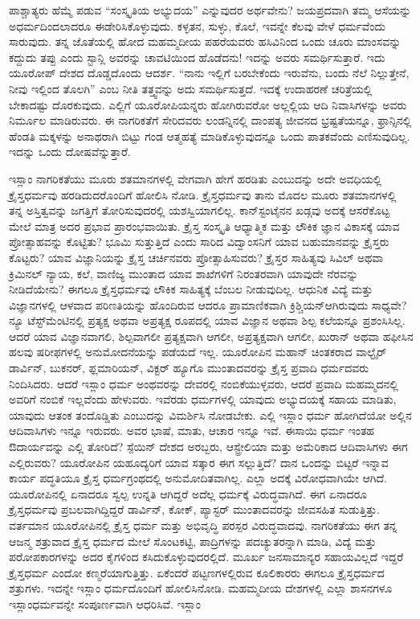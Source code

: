 ಪಾಶ್ಚಾತ್ಯರು ಹೆಮ್ಮೆ ಪಡುವ “ಸಂಸ್ಕೃತಿಯ ಅಭ್ಯುದಯ” ಎನ್ನುವುದರ ಅರ್ಥವೇನು? ಜಯಪ್ರದವಾಗಿ ತಮ್ಮ ಆಸೆಯನ್ನು ಅಧರ್ಮದಿಂದಲಾದರೂ ಈಡೇರಿಸಿಕೊಳ್ಳುವುದು. ಕಳ್ಳತನ, ಸುಳ್ಳು, ಕೊಲೆ, ಇವನ್ನೇ ಕೆಲವು ವೇಳೆ ಧರ್ಮವೆಂದು ಸಾರುವುದು. ತನ್ನ ಜೊತೆಯಲ್ಲಿ ಹೋದ ಮಹಮ್ಮದೀಯ ಪಹರೆಯವರು ಹಸಿವಿನಿಂದ ಒಂದು ಚೂರು ಮಾಂಸವನ್ನು ಕದ್ದುದು ತಪ್ಪು ಎಂದು ಸ್ಟಾನ್ಲಿ ಅವರನ್ನು ಚಾವಟಿಯಿಂದ ಹೊಡೆದನು! ಇದನ್ನು ಅವರು ಸಮರ್ಥಿಸುತ್ತಾರೆ. ಇದು ಯೂರೋಪ್​ ದೇಶದ ದೊಡ್ಡದೊಂದು ಆದರ್ಶ. “ನಾನು ಇಲ್ಲಿಗೆ ಬರಬೇಕೆಂದು ಇರುವೆನು, ಬಂದು ನೆಲೆ ನಿಲ್ಲುತ್ತೇನೆ, ನೀವು ಇಲ್ಲಿಂದ ತೊಲಗಿ” ಎಂಬ ನೀತಿ ತತ್ತ್ವವನ್ನು ಅದು ಸಮರ್ಥಿಸುತ್ತದೆ. ಇದಕ್ಕೆ ಉದಾಹರಣೆ ಚರಿತ್ರೆಯಲ್ಲಿ ಬೇಕಾದಷ್ಟು ದೊರಕುವುದು. ಎಲ್ಲಿಗೆ ಯೂರೋಪಿಯನ್ನರು ಹೋಗಿರುವರೋ ಅಲ್ಲಲ್ಲಿಯ ಆದಿ ನಿವಾಸಿಗಳನ್ನು ಅವರು ನಿರ್ಮೂಲ ಮಾಡಿರುವರು. ಈ ನಾಗರಿಕತೆಗೆ ಸೇರಿದವರು ಲಂಡನ್ನಿನಲ್ಲಿ ದಾಂಪತ್ಯ ಜೀವನದ ಭ್ರಷ್ಟತೆಯನ್ನೂ, ಫ್ರಾನ್ಸಿನಲ್ಲಿ ಹೆಂಡತಿ ಮಕ್ಕಳನ್ನು ಅನಾಥರಾಗಿ ಬಿಟ್ಟು ಗಂಡ ಆತ್ಮಹತ್ಯೆ ಮಾಡಿಕೊಳ್ಳುವುದನ್ನೂ ಒಂದು ಪಾತಕವೆಂದು ಎಣಿಸುವುದಿಲ್ಲ. ಇದನ್ನು ಒಂದು ದೋಷವೆನ್ನುತ್ತಾರೆ.

ಇಸ್ಲಾಂ ನಾಗರಿಕತೆಯು ಮೂರು ಶತಮಾನಗಳಲ್ಲಿ ವೇಗವಾಗಿ ಹೇಗೆ ಹರಡಿತು ಎಂಬುದನ್ನು ಅದೇ ಅವಧಿಯಲ್ಲಿ ಕ್ರೈಸ್ತಧರ್ಮವು ಹರಡಿದುದರೊಂದಿಗೆ ಹೋಲಿಸಿ ನೋಡಿ. ಕ್ರೈಸ್ತಧರ್ಮವು ತಾನು ಮೊದಲ ಮೂರು ಶತಮಾನಗಳಲ್ಲಿ ತನ್ನ ಅಸ್ತಿತ್ವವನ್ನು ಜಗತ್ತಿಗೆ ತೋರಿಸುವುದರಲ್ಲಿ ಯಶಸ್ವಿಯಾಗಲಿಲ್ಲ. ಕಾನ್​ಸ್ಟಂಟೈನನ ಖಡ್ಗವು ಅದಕ್ಕೆ ಆಸರೆಕೊಟ್ಟ ಮೇಲೆ ಮಾತ್ರ ಅದರ ಪ್ರಭಾವ ಪ್ರಾರಂಭವಾಯಿತು. ಕ್ರೈಸ್ತ ಸಂಸ್ಕೃತಿ ಆಧ್ಯಾತ್ಮಿಕ ಮತ್ತು ಲೌಕಿಕ ಜ್ಞಾನ ವಿಕಾಸಕ್ಕೆ ಯಾವ ಪ್ರೋತ್ಸಾಹವನ್ನು ಕೊಟ್ಟಿತು? ಭೂಮಿ ಸುತ್ತುತ್ತಿದೆ ಎಂದು ಸಾರಿದ ವಿದ್ವಾಂಸನಿಗೆ ಯಾವ ಬಹುಮಾನವನ್ನು ಕ್ರೈಸ್ತರು ಕೊಟ್ಟರು? ಯಾವ ವಿಜ್ಞಾನಿಯನ್ನು ಕ್ರೈಸ್ತ ಚರ್ಚಿನವರು ಪ್ರೋತ್ಸಾಹಿಸುವರು? ಕ್ರೈಸ್ತರ ಸಾಹಿತ್ಯವು ಸಿವಿಲ್​ ಅಥವಾ ಕ್ರಿಮಿನಲ್​ ನ್ಯಾಯ, ಕಲೆ, ವಾಣಿಜ್ಯ ಮುಂತಾದ ಯಾವ ಶಾಖೆಗಳಿಗೆ ನಿರಂತರವಾಗಿ ಯಾವುದೇ ನೆರವನ್ನು ನೀಡಿದೆಯೇನು? ಈಗಲೂ ಕ್ರೈಸ್ತಧರ್ಮವು ಲೌಕಿಕ ಸಾಹಿತ್ಯಕ್ಕೆ ಬೆಂಬಲ ನೀಡುವುದಿಲ್ಲ. ಆಧುನಿಕ ವಿದ್ಯೆ ಮತ್ತು ವಿಜ್ಞಾನಗಳಲ್ಲಿ ಆಳವಾದ ಪರಿಣತಿಯನ್ನು ಹೊಂದಿರುವ ಆದರೂ ಪ್ರಾಮಾಣಿಕವಾಗಿ ಕ್ರಿಶ್ಚಿಯನ್​ ಆಗಿರುವುದು ಸಾಧ್ಯವೇ? ನ್ಯೂ ಟೆಸ್ಟ್​ಮೆಂಟಿನಲ್ಲಿ ಪ್ರತ್ಯಕ್ಷ ಅಥವಾ ಅಪ್ರತ್ಯಕ್ಷ ರೂಪದಲ್ಲಿ ಯಾವ ವಿಜ್ಞಾನ ಅಥವಾ ಶಿಲ್ಪ ಕಲೆಯನ್ನೂ ಪ್ರಶಂಸಿಸಿಲ್ಲ. ಆದರೆ ಯಾವ ವಿಜ್ಞಾನವಾಗಲಿ, ಶಿಲ್ಪವಾಗಲೀ ಪ್ರತ್ಯಕ್ಷವಾಗಿ ಆಗಲೀ, ಅಪ್ರತ್ಯಕ್ಷವಾಗಿ ಆಗಲೀ, ಖುರಾನ್​ ಅಥವಾ ಹಫೀಸಿನ ಹಲವು ಷರೀಫಗಳಲ್ಲಿ ಅನು\break ಮೋದನೆಯನ್ನು ಪಡೆಯದೆ ಇಲ್ಲ. ಯೂರೋಪಿನ ಮಹಾನ್​ ಚಿಂತಕರಾದ ವಾಲ್ಟೈರ್​ ಡಾರ್ವಿನ್​, ಬುಕನರ್​, ಫ್ಲಮಾರಿಯನ್​, ವಿಕ್ಟರ್​ ಹ್ಯೂಗೊ ಮುಂತಾದವರನ್ನು ಕ್ರೈಸ್ತ ಪ್ರವಾದಿ ಧರ್ಮದವರು ನಿಂದಿಸಿದರು. ಆದರೆ ಇಸ್ಲಾಂ ಧರ್ಮ ಅಂಥವರನ್ನು ದೇವರಲ್ಲಿ ನಂಬಿಕೆಯುಳ್ಳವರು, ಆದರೆ ಪ್ರವಾದಿ ಮಹಮ್ಮದನಲ್ಲಿ ಅವರಿಗೆ ನಂಬಿಕೆ ಇಲ್ಲವೆಂದು ಹೇಳುವರು. ಇವೆರಡು ಧರ್ಮಗಳಲ್ಲಿ ಯಾವುದು ಅಭ್ಯುದಯಕ್ಕೆ ಸಹಾಯ ಮಾಡಿತು, ಯಾವುದು ಆತಂಕ ತಂದೊಡ್ಡಿತು ಎಂಬುದನ್ನು ವಿಮರ್ಶಿಸಿ ನೋಡಬೇಕು. ಎಲ್ಲಿ ಇಸ್ಲಾಂ ಧರ್ಮ ಹೋಗಿದೆಯೋ ಅಲ್ಲಿನ ಆದಿವಾಸಿಗಳು ಇನ್ನೂ ಇರುವರು. ಅವರ ಭಾಷೆ, ಮಾತು, ಆಚಾರ ಇನ್ನೂ ಇವೆ. ಈಸಾಯಿ ಧರ್ಮ ಇಂತಹ ಔದಾರ್ಯವನ್ನು ಎಲ್ಲಿ ತೋರಿದೆ? ಸ್ಪೆಯಿನ್​ ದೇಶದ ಅರಬ್ಬರು, ಆಸ್ಟ್ರೇಲಿಯಾ ಮತ್ತು ಅಮೆರಿಕಾದ ಆದಿವಾಸಿಗಳು ಈಗ ಎಲ್ಲಿರುವರು? ಯೂರೋಪಿನ ಯಹೂದ್ಯರಿಗೆ ಯಾವ ಸತ್ಕಾರ ಈಗ ಸಲ್ಲುತ್ತಿದೆ? ದಾನ ಒಂದನ್ನು ಬಿಟ್ಟರೆ ಇನ್ನಾವ ಕಾರ್ಯ ಪದ್ಧತಿಯೂ ಕ್ರೈಸ್ತ ಧರ್ಮಗ್ರಂಥದಲ್ಲಿ ಅನುಮೋದಿತವಾಗಿಲ್ಲ. ಎಲ್ಲಾ ಅದಕ್ಕೆ ವಿರೋಧವಾಗಿಯೇ ಆಗಿದೆ. ಯೂರೋಪಿನಲ್ಲಿ ಏನಾದರೂ ಸ್ವಲ್ಪ ಉನ್ನತಿ ಆಗಿದ್ದರೆ ಅದೆಲ್ಲ ಧರ್ಮಕ್ಕೆ ವಿರುದ್ಧವಾಗಿದೆ. ಈಗ ಏನಾದರೂ ಕ್ರೈಸ್ತಧರ್ಮವು ಪ್ರಬಲವಾಗಿದ್ದಿದ್ದರೆ ಡಾರ್ವಿನ್​, ಕೋಕ್​, ಪ್ಯಾಸ್ಟರ್​ ಮುಂತಾದವರನ್ನು ಜೀವಸಹಿತ ಸುಡುತ್ತಿತ್ತು. ವರ್ತಮಾನ ಯೂರೋಪಿನಲ್ಲಿ ಕ್ರೈಸ್ತ ಧರ್ಮ ಮತ್ತು ಅಭಿವೃದ್ಧಿ ಪರಸ್ಪರ ವಿರುದ್ಧವಾದವು. ನಾಗರಿಕತೆಯು ಈಗ ತನ್ನ ಆಜನ್ಮ ಶತ್ರುವಾದ ಕ್ರೈಸ್ತ ಧರ್ಮದ ಮೇಲೆ ಸೊಂಟಕಟ್ಟಿ, ಪಾದ್ರಿಗಳನ್ನು ಪದಚ್ಯುತರನ್ನಾಗಿ ಮಾಡಿ, ವಿದ್ಯೆ ಮತ್ತು ಪರೋಪಕಾರಗಳನ್ನು ಅದರ ಕೈಗಳಿಂದ ಕಸಿದುಕೊಳ್ಳುವುದರಲ್ಲಿದೆ. ಮೂರ್ಖ ಜನ\break ಸಾಮಾನ್ಯರ ಸಹಾಯವಿಲ್ಲದೆ ಇದ್ದರೆ ಕ್ರೈಸ್ತಧರ್ಮ ಎಂದೋ ಕಣ್ಮರೆಯಾಗುತ್ತಿತ್ತು. ಏಕೆಂದರೆ ಪಟ್ಟಣಗಳಲ್ಲಿರುವ ಕೂಲಿಕಾರರು ಈಗಲೂ ಕ್ರೈಸ್ತಧರ್ಮದ ಶತ್ರುಗಳು. ಇದನ್ನೇ ಇಸ್ಲಾಂ ಧರ್ಮದೊಂದಿಗೆ ಹೋಲಿಸಿನೋಡಿ. ಮಹಮ್ಮದೀಯ ದೇಶಗಳಲ್ಲಿ ಎಲ್ಲಾ ಶಾಸನಗಳೂ ಇಸ್ಲಾಂಧರ್ಮವನ್ನೇ ಸಂಪೂರ್ಣವಾಗಿ ಆಧರಿಸಿವೆ. ಇಸ್ಲಾಂ 